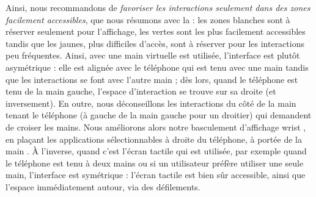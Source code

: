 

Ainsi, nous recommandons de \emph{favoriser les interactions seulement dans des zones facilement accessibles}, que nous résumons avec la  : les zones blanches sont à réserver seulement pour l'affichage, les vertes sont les plus facilement accessibles tandis que les jaunes, plus difficiles d'accès, sont à réserver pour les interactions peu fréquentes. Ainsi, avec une main virtuelle est utilisée, l'interface est plutôt asymétrique  : elle est alignée avec le téléphone qui est tenu avec une main tandis que les interactions se font avec l'autre main ; dès lors, quand le téléphone est tenu de la main gauche, l'espace d'interaction se trouve sur sa droite (et inversement). En outre, nous déconseillons les interactions du côté de la main tenant le téléphone (à gauche de la main gauche pour un droitier) qui demandent de croiser les mains. Nous améliorons alors notre basculement d'affichage wrist , en plaçant les applications sélectionnables à droite du téléphone, à portée de la main . À l'inverse, quand c'est l'écran tactile qui est utilisée, par exemple quand le téléphone est tenu à deux mains ou si un utilisateur préfère utiliser une seule main, l'interface est symétrique  : l'écran tactile est bien sûr accessible, ainsi que l'espace immédiatement autour, via des défilements.


